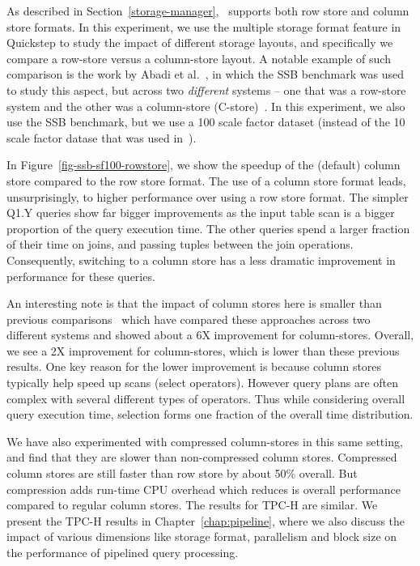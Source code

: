 As described in Section~\ref{storage-manager}, \Quickstep\ supports both row store and column store formats. %
In this experiment, we use the multiple storage format feature in Quickstep to study the impact of different storage layouts, and specifically we compare a row-store versus a column-store layout. A notable example of such comparison is the work by Abadi et al.~\cite{DBLP:conf/sigmod/AbadiMH08}, in which the SSB benchmark was used to study this aspect, but across two \textit{different} systems -- one that was a row-store system and the other was a column-store (C-store)~\cite{StonebrakerABCCFLLMOORTZ05}.  In this experiment, we also use the SSB benchmark, but we use a 100 scale factor dataset (instead of the 10 scale factor datase that was used in~\cite{DBLP:conf/sigmod/AbadiMH08}).

In Figure~\ref{fig-ssb-sf100-rowstore}, we show the speedup of the (default) column store compared to the row store format.
The use of a column store format leads, unsurprisingly, to higher performance over using a row store format. %
The simpler Q1.Y queries show far bigger improvements as the input table scan is a bigger proportion of the query execution time. The other queries spend a larger fraction of their time on joins, and passing tuples between the join operations. Consequently, switching to a column store has a less dramatic improvement in performance for these queries.

An interesting note is that the impact of column stores here is  smaller than previous comparisons~\cite{DBLP:conf/sigmod/AbadiMH08} which have compared these approaches across two different systems and showed about a 6X improvement for column-stores. Overall, we see a 2X improvement for column-stores, which is lower than these previous results.
One key reason for the lower improvement is because column stores typically help speed up scans (select operators).
However query plans are often complex with several different types of operators. 
Thus while considering overall query execution time, selection forms one fraction of the overall time distribution. 

We have also experimented with compressed column-stores in this same setting, and find that they are slower than non-compressed column stores. Compressed column stores are still faster than row store by about 50\% overall. But compression adds run-time CPU overhead which reduces is overall performance compared to regular column stores. 
The results for TPC-H are similar. 
We present the TPC-H results in Chapter~\ref{chap:pipeline}, where we also discuss the impact of various dimensions like storage format, parallelism and block size on the performance of pipelined query processing.

